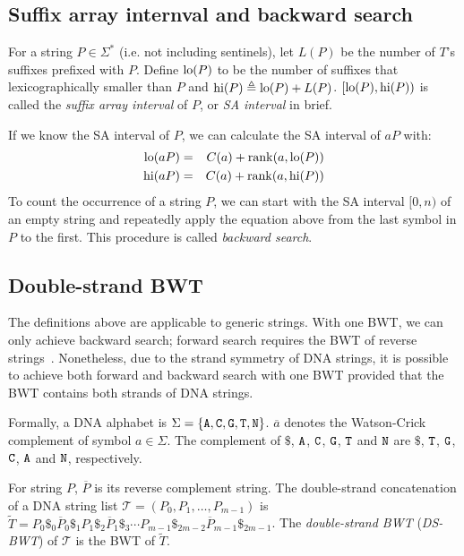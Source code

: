 \documentclass[webpdf,contemporary,large,namedate]{oup-authoring-template}%
\begin{document}
\subsection{Suffix array internval and backward search}

For a string $P\in\Sigma^*$ (i.e. not including sentinels), let $L(P)$ be the number of $T$'s suffixes prefixed with $P$.
Define ${\rm lo}(P)$ to be the number of suffixes that lexicographically smaller than $P$
and ${\rm hi}(P)\triangleq {\rm lo}(P)+L(P)$.
$[{\rm lo}(P),{\rm hi}(P))$ is called the \emph{suffix array interval} of $P$, or \emph{SA interval} in brief.

If we know the SA interval of $P$, we can calculate the SA interval of $aP$ with:
\begin{eqnarray*}
{\rm lo}(aP)&=&C(a)+{\rm rank}(a,{\rm lo}(P))\\
{\rm hi}(aP)&=&C(a)+{\rm rank}(a,{\rm hi}(P))
\end{eqnarray*}
To count the occurrence of a string $P$,
we can start with the SA interval $[0,n)$ of an empty string and repeatedly apply the equation above from the last symbol in $P$ to the first.
This procedure is called \emph{backward search}.

\subsection{Double-strand BWT}

The definitions above are applicable to generic strings.
With one BWT, we can only achieve backward search;
forward search requires the BWT of reverse strings~\citep{DBLP:conf/bibm/LamLTWWY09}.
Nonetheless, due to the strand symmetry of DNA strings,
it is possible to achieve both forward and backward search with one BWT provided that the BWT contains both strands of DNA strings.

Formally, a DNA alphabet is $\Sigma=\{{\tt A},{\tt C},{\tt G},{\tt T},{\tt N}\}$.
$\overline{a}$ denotes the Watson-Crick complement of symbol $a\in\Sigma$.
The complement of $\$$, ${\tt A}$, ${\tt C}$, ${\tt G}$, ${\tt T}$ and ${\tt N}$
are $\$$, ${\tt T}$, ${\tt G}$, ${\tt C}$, ${\tt A}$ and ${\tt N}$, respectively.

For string $P$, $\overline{P}$ is its reverse complement string.
The double-strand concatenation of a DNA string list $\mathcal{T}=(P_0,P_1,\ldots,P_{m-1})$ is
$\tilde{T}=P_0\$_0\overline{P}_0\$_1P_1\$_2\overline{P}_1\$_3\cdots P_{m-1}\$_{2m-2}\overline{P}_{m-1}\$_{2m-1}$.
The \emph{double-strand BWT} (\emph{DS-BWT}) of $\mathcal{T}$ is the BWT of $\tilde{T}$.
\end{document}
